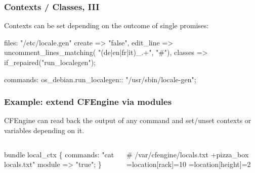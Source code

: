 \documentclass[english,serif,mathserif,usenames,dvipsnames]{beamer}
\begin{document}
\begin{frame}
  \frametitle{Contexts / Classes, III}
  Contexts can be set depending on the outcome of single promises:
\begin{semiverbatim}
files:
  "/etc/locale.gen"
  create    => "false",
  edit_line => uncomment_lines_matching(
                  "(de|en|fr|it)_.+", "#"),
  \alert<1>{classes   => if_repaired("run_localegen");}
\end{semiverbatim}

\begin{semiverbatim}
commands:
  os_debian.run_localegen::
    "/usr/sbin/locale-gen";
\end{semiverbatim}
\end{frame}


\begin{frame}[fragile]
  \frametitle{Example: extend CFEngine via modules}
  CFEngine can read back the output of any command and set/unset
  contexts or variables depending on it.
  \begin{columns}
    \begin{column}{0.5\linewidth}
\begin{semiverbatim}\small
bundle local_ctx \{
  commands:
    "cat locals.txt"
    \alert<1>{module => "true";}
\}
\end{semiverbatim}
    \end{column}
    \begin{column}{0.5\linewidth}
\begin{semiverbatim}\small
\alert<4>{# /var/cfengine/locals.txt}
\alert<2>{+pizza_box}
\alert<3>{=location[rack]=10}
\alert<3>{=location[height]=2}
\end{semiverbatim}
    \end{column}
  \end{columns}

  \+
\end{frame}
\end{document}
